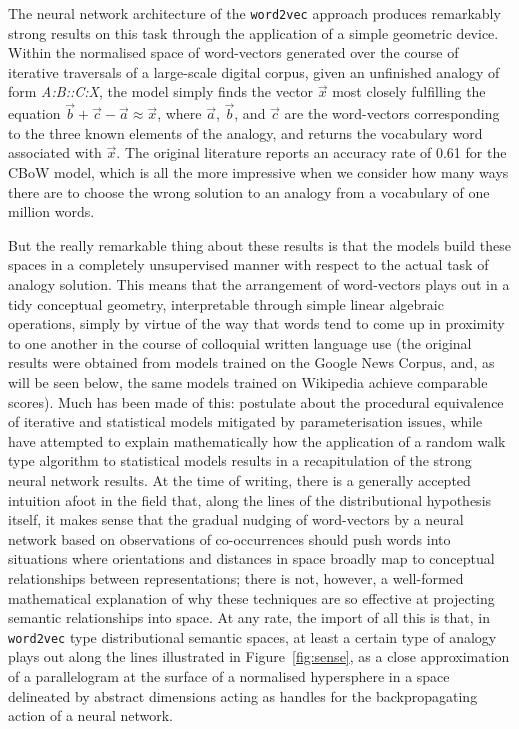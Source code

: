 The neural network architecture of the \texttt{word2vec} approach produces remarkably strong results on this task through the application of a simple geometric device.  Within the normalised space of word-vectors generated over the course of iterative traversals of a large-scale digital corpus, given an unfinished analogy of form \emph{A:B::C:X}, the model simply finds the vector $\overrightarrow{x}$ most closely fulfilling the equation $\overrightarrow{b} + \overrightarrow{c} - \overrightarrow{a} \approx \overrightarrow{x}$, where $\overrightarrow{a}$, $\overrightarrow{b}$, and $\overrightarrow{c}$ are the word-vectors corresponding to the three known elements of the analogy, and returns the vocabulary word associated with $\overrightarrow{x}$.  The original literature reports an accuracy rate of 0.61 for the CBoW model, which is all the more impressive when we consider how many ways there are to choose the wrong solution to an analogy from a vocabulary of one million words.  \citep[It should be noted that similarly strong results have been reported for the hybrid frequentist-neural model of][.]{PenningtonEA2014}

But the really remarkable thing about these results is that the models build these spaces in a completely unsupervised manner with respect to the actual task of analogy solution.  This means that the arrangement of word-vectors plays out in a tidy conceptual geometry, interpretable through simple linear algebraic operations, simply by virtue of the way that words tend to come up in proximity to one another in the course of colloquial written language use (the original results were obtained from models trained on the Google News Corpus, and, as will be seen below, the same models trained on Wikipedia achieve comparable scores).  Much has been made of this: \cite{LevyEA2014} postulate about the procedural equivalence of iterative and statistical models mitigated by parameterisation issues, while \cite{AroraEA2015} have attempted to explain mathematically how the application of a random walk type algorithm to statistical models results in a recapitulation of the strong neural network results.  At the time of writing, there is a generally accepted intuition afoot in the field that, along the lines of the distributional hypothesis itself, it makes sense that the gradual nudging of word-vectors by a neural network based on observations of co-occurrences should push words into situations where orientations and distances in space broadly map to conceptual relationships between representations; there is not, however, a well-formed mathematical explanation of why these techniques are so effective at projecting semantic relationships into space.  At any rate, the import of all this is that, in \texttt{word2vec} type distributional semantic spaces, at least a certain type of analogy plays out along the lines illustrated in Figure~\ref{fig:sense}, as a close approximation of a parallelogram at the surface of a normalised hypersphere in a space delineated by abstract dimensions acting as handles for the backpropagating action of a neural network.


